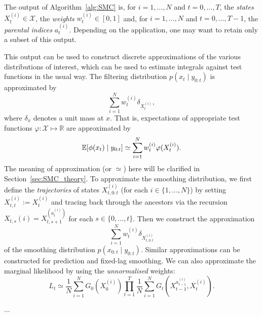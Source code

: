 The output of Algorithm~\ref{alg:SMC} is, for $i=1,\dots, N$ and $t=0,\dots,T$, the \emph{states} $X_t^{(i)} \in \mathcal{X}$, the \emph{weights} $w_t^{(i)} \in [0,1]$ and, for $i=1,\dots, N$ and $t=0,\dots,T-1$, the \emph{parental indices} $a_t^{(i)}$.
Depending on the application, one may want to retain only a subset of this output.

This output can be used to construct discrete approximations of the various distributions of interest, which can be used to estimate integrals against test functions in the usual way.
The filtering distribution $p(x_t \mid y_{0:t})$ is approximated by
\begin{equation*}
\sum_{i=1}^N w_t^{(i)} \delta_{ X_t^{(i)} } ,
\end{equation*}
where $\delta_x$ denotes a unit mass at $x$.
That is, expectations of appropriate test functions $\varphi : \mathcal{X} \mapsto \mathbb{R}$ are approximated by
\begin{equation*}
\mathbb{E}[ \phi(x_t) \mid y_{0:t} ]
\simeq \sum_{i=1}^N w_t^{(i)} \varphi( X_t^{(i)} ) .
\end{equation*}
The meaning of approximation (or $\simeq$) here will be clarified in Section~\ref{sec:SMC_theory}.
To approximate the smoothing distribution, we first define the \emph{trajectories} of states $X_{t,0:t}^{(i)}$ (for each $i \in \{1,\dots,N\}$) by setting $X_{t,t}^{(i)} := X_t^{(i)}$ and tracing back through the ancestors via the recursion $X_{t,s}{(i)} = X_{t,s+1}^{( a_t^{(i)} )}$ for each $s \in \{0,\dots, t\}$. 
Then we construct the approximation
\begin{equation*}
\sum_{i=1}^N w_t^{(i)} \delta_{ X_{t,0:t}^{(i)} } 
\end{equation*}
of the smoothing distribution $p(x_{0:t} \mid y_{0:t})$.
Similar approximations can be constructed for prediction and fixed-lag smoothing.
We can also approximate the marginal likelihood by using the \emph{unnormalised} weights:
\begin{equation*}
L_t 
\simeq \frac{1}{N} \sum_{i=1}^N G_0(X_0^{(i)}) \prod_{t=1}^T \frac{1}{N}
        \sum_{i=1}^N G_t( X_{t-1}^{ a_{t-1}^{(i)} }, X_t^{(i)} ) .
\end{equation*}


...


